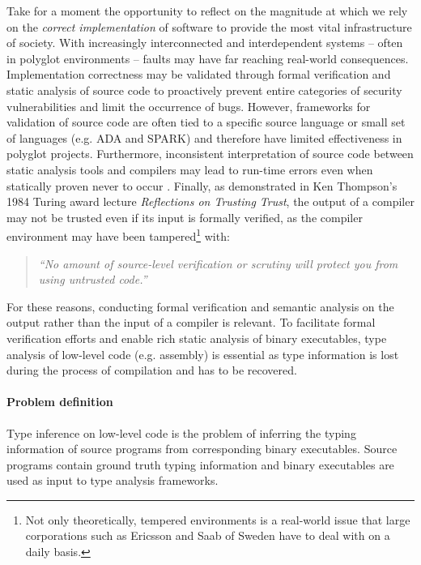 \documentclass[10pt, a4paper, sigplan, authordraft]{acmart}
\begin{document}
Take for a moment the opportunity to reflect on the magnitude at which we rely on the \textit{correct implementation} of software to provide the most vital infrastructure of society. With increasingly interconnected and interdependent systems -- often in polyglot environments -- faults may have far reaching real-world consequences. Implementation correctness may be validated through formal verification and static analysis of source code to proactively prevent entire categories of security vulnerabilities and limit the occurrence of bugs. However, frameworks for validation of source code are often tied to a specific source language or small set of languages (e.g. ADA and SPARK) and therefore have limited effectiveness in polyglot projects. Furthermore, inconsistent interpretation of source code between static analysis tools and compilers may lead to run-time errors even when statically proven never to occur \cite{ada_static_analysis_and_compiler_inconsistencies}. Finally, as demonstrated in Ken Thompson's 1984 Turing award lecture \textit{Reflections on Trusting Trust}, the output of a compiler may not be trusted even if its input is formally verified, as the compiler environment may have been tampered\footnote{Not only theoretically, tempered environments is a real-world issue that large corporations such as Ericsson and Saab of Sweden have to deal with on a daily basis.} with:

\begin{quote}
	\textit{``No amount of source-level verification or scrutiny will protect you from using untrusted code.''} \cite{trusting_trust}
\end{quote}

For these reasons, conducting formal verification and semantic analysis on the output rather than the input of a compiler is relevant. To facilitate formal verification efforts and enable rich static analysis of binary executables, type analysis of low-level code (e.g. assembly) is essential as type information is lost during the process of compilation and has to be recovered.


\paragraph{Problem definition} Type inference on low-level code is the problem of inferring the typing information of source programs from corresponding binary executables. Source programs contain ground truth typing information and binary executables are used as input to type analysis frameworks.
\end{document}
